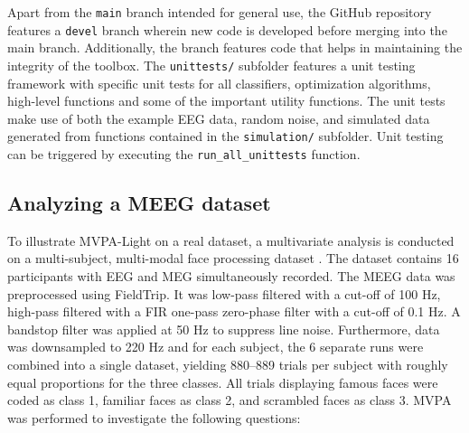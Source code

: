 \documentclass[utf8]{frontiersSCNS} %
\newcommand{\ttt}[1]{\texttt{#1}}
\begin{document}
Apart from the \ttt{main} branch intended for general use, the GitHub repository features a \ttt{devel} branch wherein new code is developed before merging into the main branch. Additionally, the branch features code that helps in maintaining the integrity of the toolbox. The \ttt{unittests/} subfolder features a unit testing framework with specific unit tests for all classifiers, optimization algorithms, high-level functions and some of the important utility functions. The unit tests make use of both the example EEG data, random noise, and simulated data generated from functions contained in the \ttt{simulation/} subfolder. Unit testing can be triggered by executing the \ttt{run\_all\_unittests} function.

\subsection{Analyzing a MEEG dataset}

To illustrate MVPA-Light on a real dataset, a multivariate analysis is conducted on a multi-subject, multi-modal face processing dataset \citep{Wakeman2015ADataset,Wakeman2014OpenfMRI}. The dataset contains 16 participants with EEG and MEG simultaneously recorded. The MEEG data was preprocessed using FieldTrip. It was low-pass filtered with a cut-off of 100 Hz, high-pass filtered with a FIR one-pass zero-phase filter with a cut-off of 0.1 Hz. A bandstop filter was applied at 50 Hz to suppress line noise. Furthermore, data was downsampled to 220 Hz and for each subject, the 6 separate runs were combined into a single dataset, yielding 880--889 trials per subject with roughly equal proportions for the three classes. All trials displaying famous faces were coded as class 1, familiar faces as class 2, and scrambled faces as class 3. MVPA was performed to investigate the following questions:
\end{document}
